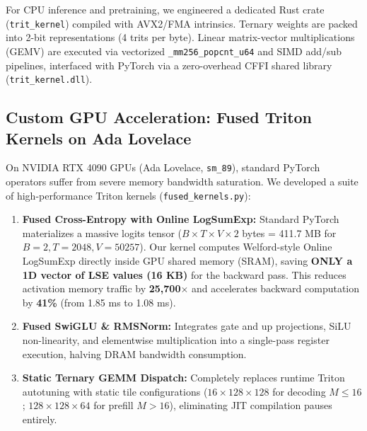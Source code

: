\documentclass[11pt,a4paper]{article}
\begin{document}
For CPU inference and pretraining, we engineered a dedicated Rust crate (\texttt{trit\_kernel}) compiled with AVX2/FMA intrinsics. Ternary weights are packed into 2-bit representations (4 trits per byte). Linear matrix-vector multiplications (GEMV) are executed via vectorized \texttt{\_mm256\_popcnt\_u64} and SIMD add/sub pipelines, interfaced with PyTorch via a zero-overhead CFFI shared library (\texttt{trit\_kernel.dll}).

\subsection{Custom GPU Acceleration: Fused Triton Kernels on Ada Lovelace}

On NVIDIA RTX 4090 GPUs (Ada Lovelace, \texttt{sm\_89}), standard PyTorch operators suffer from severe memory bandwidth saturation. We developed a suite of high-performance Triton kernels (\texttt{fused\_kernels.py}):
\begin{enumerate}
    \item \textbf{Fused Cross-Entropy with Online LogSumExp:} Standard PyTorch materializes a massive logits tensor ($B \times T \times V \times 2$ bytes = 411.7 MB for $B=2, T=2048, V=50257$). Our kernel computes Welford-style Online LogSumExp directly inside GPU shared memory (SRAM), saving \textbf{ONLY a 1D vector of LSE values (16 KB)} for the backward pass. This reduces activation memory traffic by \textbf{25,700$\times$} and accelerates backward computation by \textbf{41\%} (from 1.85 ms to 1.08 ms).
    \item \textbf{Fused SwiGLU \& RMSNorm:} Integrates gate and up projections, SiLU non-linearity, and elementwise multiplication into a single-pass register execution, halving DRAM bandwidth consumption.
    \item \textbf{Static Ternary GEMM Dispatch:} Completely replaces runtime Triton autotuning with static tile configurations ($16\times 128\times 128$ for decoding $M \le 16$; $128\times 128\times 64$ for prefill $M > 16$), eliminating JIT compilation pauses entirely.
\end{enumerate}
\end{document}
